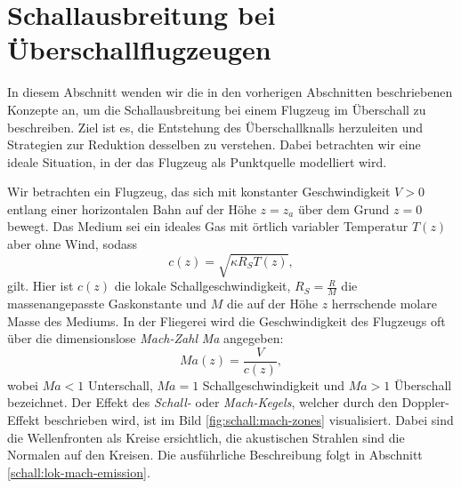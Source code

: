 %
%
%
%
\section{Schallausbreitung bei Überschallflugzeugen
\label{schall:section:teil3}}
%

In diesem Abschnitt wenden wir die in den vorherigen Abschnitten
beschriebenen Konzepte an, um die Schallausbreitung bei einem
Flugzeug im Überschall zu beschreiben.
Ziel ist es, die Entstehung des Überschallknalls herzuleiten und Strategien
%
zur Reduktion desselben zu verstehen.
Dabei betrachten wir eine ideale Situation, in der das Flugzeug als
Punktquelle modelliert wird.

Wir betrachten ein Flugzeug, das sich mit konstanter Geschwindigkeit
$V>0$ entlang einer horizontalen Bahn auf der Höhe $z=z_a$ über
dem Grund $z=0$ bewegt.
Das Medium sei ein ideales Gas mit örtlich variabler Temperatur
$T(z)$ aber ohne Wind, sodass
\begin{equation}
    c(z) = \sqrt{\kappa R_ST(z)} ,
    \label{eq:c-of-z}
\end{equation}
gilt. Hier ist $c(z)$ die lokale Schallgeschwindigkeit, $R_S = \frac{R}{M}$
die massenangepasste Gaskonstante und $M$ die auf der Höhe $z$ herrschende
molare Masse des Mediums.
In der Fliegerei wird die Geschwindigkeit des Flugzeugs oft über die
dimensionslose \emph{Mach-Zahl} \textit{Ma} angegeben:
%
\begin{equation}
    \textit{Ma}(z) = \frac{V}{c(z)},
    \label{eq:mach-number}
\end{equation}
wobei $\textit{Ma}<1$ Unterschall, $\textit{Ma}=1$ Schallgeschwindigkeit
und $\textit{Ma}>1$ Überschall bezeichnet.
Der Effekt des \emph{Schall-} oder \emph{Mach-Kegels},
welcher durch den Doppler-Effekt 
beschrieben wird, ist im Bild \ref{fig:schall:mach-zones} visualisiert.
Dabei sind die Wellenfronten als Kreise ersichtlich, die akustischen
Strahlen sind die Normalen auf den Kreisen. Die ausführliche Beschreibung
folgt in Abschnitt \ref{schall:lok-mach-emission}.

